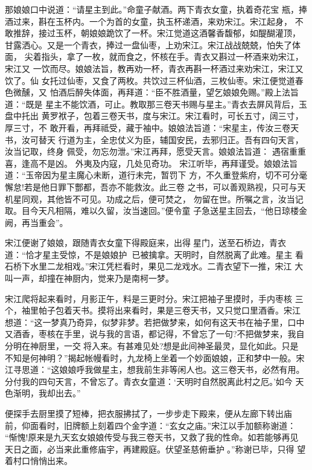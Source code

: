 那娘娘口中说道：“请星主到此。”命童子献酒。两下青衣女童，执着奇花宝
瓶，捧酒过来，斟在玉杯内。一个为首的女童，执玉杯递酒，来劝宋江。宋江起身，
不敢推辞，接过玉杯，朝娘娘跪饮了一杯。宋江觉道这酒馨香馥郁，如醍醐灌顶，
甘露洒心。又是一个青衣，捧过一盘仙枣，上劝宋江。宋江战战兢兢，怕失了体面，
尖着指头，拿了一枚，就而食之，怀核在手。青衣又斟过一杯酒来劝宋江，宋江又
一饮而尽。娘娘法旨，教再劝一杯，青衣再斟一杯酒过来劝宋江，宋江又饮了。仙
女托过仙枣，又食了两枚。共饮过三杯仙酒，三枚仙枣。宋江便觉道春色微醺，又
怕酒后醉失体面，再拜道：“臣不胜酒量，望乞娘娘免赐。”殿上法旨道：“既是
星主不能饮酒，可止。教取那三卷天书赐与星主。”青衣去屏风背后，玉盘中托出
黄罗袱子，包着三卷天书，度与宋江。宋江看时，可长五寸，阔三寸，厚三寸，不
敢开看，再拜祗受，藏于袖中。娘娘法旨道：“宋星主，传汝三卷天书，汝可替天
行道为主，全忠仗义为臣，辅国安民，去邪归正。吾有四句天言，汝当记取，终身
佩受，勿忘勿泄。”宋江再拜，愿受天言。娘娘法旨道：
遇宿重重喜，逢高不是凶。
外夷及内寇，几处见奇功。
宋江听毕，再拜谨受。娘娘法旨道：“玉帝因为星主魔心未断，道行未完，暂罚下
方，不久重登紫府，切不可分毫懈怠!若是他日罪下酆都，吾亦不能救汝。此三卷
之书，可以善观熟视，只可与天机星同观，其他皆不可见。功成之后，便可焚之，
勿留在世。所嘱之言，汝当记取。目今天凡相隔，难以久留，汝当速回。”便令童
子急送星主回去，“他日琼楼金阙，再当重会”。

宋江便谢了娘娘，跟随青衣女童下得殿庭来，出得星门，送至石桥边，青衣
道：“恰才星主受惊，不是娘娘护，已被擒拿。天明时，自然脱离了此难。星主
看石桥下水里二龙相戏。”宋江凭栏看时，果见二龙戏水。二青衣望下一推，宋江
大叫一声，却撞在神厨内，觉来乃是南柯一梦。

宋江爬将起来看时，月影正午，料是三更时分。宋江把袖子里摸时，手内枣核
三个，袖里帕子包着天书。摸将出来看时，果是三卷天书，又只觉口里酒香。宋江
想道：“这一梦真乃奇异，似梦非梦。若把做梦来，如何有这天书在袖子里，口中
又酒香，枣核在手里，说与我的言语，都记得，不曾忘了一句?不把做梦来，我自
分明在神厨里，一交将入来。有甚难见处?想是此间神圣最灵，显化如此。只是
不知是何神明？”揭起帐幔看时，九龙椅上坐着一个妙面娘娘，正和梦中一般。宋
江寻思道：“这娘娘呼我做星主，想我前生非等闲人也。这三卷天书，必然有用。
分付我的四句天言，不曾忘了。青衣女童道：‘天明时自然脱离此村之厄。’如今
天色渐明，我却出去。”

便探手去厨里摸了短棒，把衣服拂拭了，一步步走下殿来，便从左廊下转出庙
前，仰面看时，旧牌额上刻着四个金字道：“玄女之庙。”宋江以手加额称谢道：
“惭愧!原来是九天玄女娘娘传受与我三卷天书，又救了我的性命。如若能够再见
天日之面，必当来此重修庙宇，再建殿庭。伏望圣慈俯垂护。”称谢已毕，只得
望着村口悄悄出来。

